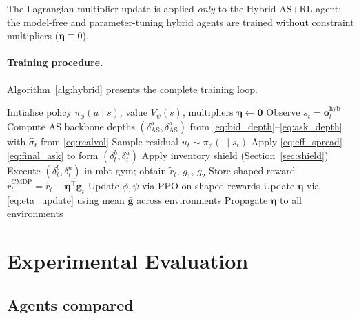 \documentclass[11pt]{article}
\begin{document}
The Lagrangian multiplier update is applied \emph{only} to the Hybrid AS+RL
agent; the model-free and parameter-tuning hybrid agents are trained without
constraint multipliers ($\boldsymbol{\eta} \equiv 0$).

\paragraph{Training procedure.}
Algorithm~\ref{alg:hybrid} presents the complete training loop.

\begin{algorithm}[H]
\caption{Hybrid AS + Residual RL with Lagrangian CMDP}
\label{alg:hybrid}
\begin{algorithmic}[1]
\STATE Initialise policy $\pi_\phi(u \mid s)$, value $V_\psi(s)$,
       multipliers $\boldsymbol{\eta} \leftarrow \mathbf{0}$
      \STATE Observe $s_t = \mathbf{o}^{\text{hyb}}_t$
      \STATE Compute AS backbone depths
             $(\delta^b_{\text{AS}}, \delta^a_{\text{AS}})$
             from \eqref{eq:bid_depth}--\eqref{eq:ask_depth}
             with $\hat\sigma_t$ from \eqref{eq:realvol}
      \STATE Sample residual $u_t \sim \pi_\phi(\cdot \mid s_t)$
      \STATE Apply \eqref{eq:eff_spread}--\eqref{eq:final_ask}
             to form $(\delta^b_t, \delta^a_t)$
      \STATE Apply inventory shield (Section~\ref{sec:shield})
      \STATE Execute $(\delta^b_t, \delta^a_t)$ in mbt-gym;
             obtain $\tilde{r}_t$, $g_1$, $g_2$
      \STATE Store shaped reward $\tilde{r}_t^{\text{CMDP}} =
             \tilde{r}_t - \boldsymbol{\eta}^\top \mathbf{g}_t$
    \ENDFOR
  \ENDFOR
  \STATE Update $\phi, \psi$ via PPO on shaped rewards
  \STATE Update $\boldsymbol{\eta}$ via \eqref{eq:eta_update}
         using mean $\bar{\mathbf{g}}$ across environments
  \STATE Propagate $\boldsymbol{\eta}$ to all environments
\ENDFOR
\end{algorithmic}
\end{algorithm}

\section{Experimental Evaluation}
\label{sec:experiments}

\subsection{Agents compared}
\end{document}

